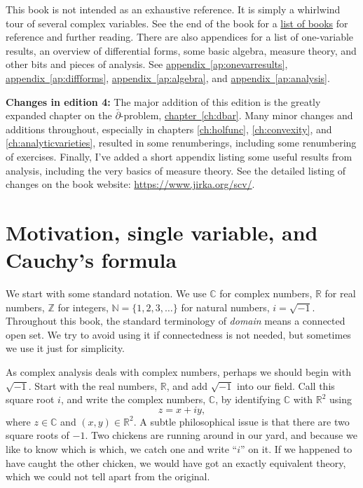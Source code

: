 \documentclass[12pt,openany]{book}
\newcommand{\C}{{\mathbb{C}}}
\newcommand{\R}{{\mathbb{R}}}
\newcommand{\Z}{{\mathbb{Z}}}
\newcommand{\N}{{\mathbb{N}}}
\newcommand{\myindex}[1]{#1\index{#1}}
\theoremstyle{plain}
\theoremstyle{remark}
\theoremstyle{definition}
\theoremstyle{exercise}
\theoremstyle{example}
\newcommand{\chapterref}[1]{\hyperref[#1]{chapter~\ref*{#1}}}
\newcommand{\appendixref}[1]{\hyperref[#1]{appendix~\ref*{#1}}}
\begin{document}
This book is not intended as an exhaustive reference.
It is simply a whirlwind tour of several complex variables.
See the end of the book
for a \hyperref[ch:furtherreading]{list of books} for
reference and further reading.  There are also appendices for
a list of one-variable results, an overview of differential forms,
some basic algebra, measure theory, and other bits and pieces of analysis.
See \appendixref{ap:onevarresults},
\appendixref{ap:diffforms},
\appendixref{ap:algebra}, and
\appendixref{ap:analysis}.

\textbf{Changes in edition 4:}
The major addition of this edition is the greatly
expanded chapter on the
$\bar{\partial}$-problem, \chapterref{ch:dbar}.
Many minor changes and additions throughout, especially in chapters
\ref{ch:holfunc}, \ref{ch:convexity}, and \ref{ch:analyticvarieties},
resulted in some renumberings, including some renumbering of exercises.
Finally, I've added a short
appendix listing some useful results from analysis, including the very
basics of measure theory.
See the detailed listing of changes on the book website:
\url{https://www.jirka.org/scv/}.


\section{Motivation, single variable, and Cauchy's formula} \label{sec:motivation}


We start with some standard notation.
We use $\C$ for complex numbers, $\R$
for real numbers,
$\Z$ for integers,
$\N = \{ 1,2,3,\ldots \}$ for natural
numbers,
$i = \sqrt{-1}$.  Throughout this book,
the standard terminology of \emph{\myindex{domain}} means a connected open
set.  We try to avoid using it if connectedness is not needed, but
sometimes we use it just for simplicity.

As complex analysis deals with complex numbers, perhaps we should begin
with $\sqrt{-1}$.  Start with the real numbers, $\R$, and add
$\sqrt{-1}$ into our field.  Call this square root $i$, and write the
complex numbers, $\C$, by identifying $\C$ with $\R^2$ using
\begin{equation*}
z = x+iy,
\end{equation*}
where $z \in \C$ and $(x,y) \in \R^2$.
A subtle philosophical issue is that there are two square roots of $-1$.
Two chickens are running around in our yard, and because we like to
know which is which, we catch one and write ``$i$'' on it.  If we happened
to have caught the other chicken, we would have got an exactly equivalent
theory, which we could not tell apart from the original.
\end{document}

